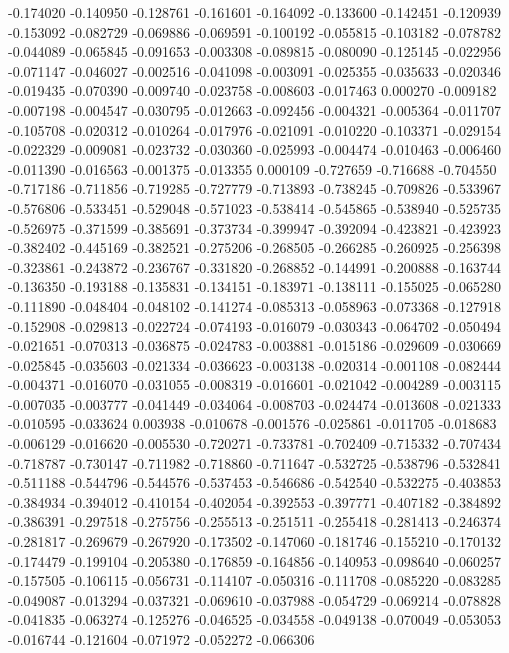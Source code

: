 -0.174020
-0.140950
-0.128761
-0.161601
-0.164092
-0.133600
-0.142451
-0.120939
-0.153092
-0.082729
-0.069886
-0.069591
-0.100192
-0.055815
-0.103182
-0.078782
-0.044089
-0.065845
-0.091653
-0.003308
-0.089815
-0.080090
-0.125145
-0.022956
-0.071147
-0.046027
-0.002516
-0.041098
-0.003091
-0.025355
-0.035633
-0.020346
-0.019435
-0.070390
-0.009740
-0.023758
-0.008603
-0.017463
0.000270
-0.009182
-0.007198
-0.004547
-0.030795
-0.012663
-0.092456
-0.004321
-0.005364
-0.011707
-0.105708
-0.020312
-0.010264
-0.017976
-0.021091
-0.010220
-0.103371
-0.029154
-0.022329
-0.009081
-0.023732
-0.030360
-0.025993
-0.004474
-0.010463
-0.006460
-0.011390
-0.016563
-0.001375
-0.013355
0.000109
-0.727659
-0.716688
-0.704550
-0.717186
-0.711856
-0.719285
-0.727779
-0.713893
-0.738245
-0.709826
-0.533967
-0.576806
-0.533451
-0.529048
-0.571023
-0.538414
-0.545865
-0.538940
-0.525735
-0.526975
-0.371599
-0.385691
-0.373734
-0.399947
-0.392094
-0.423821
-0.423923
-0.382402
-0.445169
-0.382521
-0.275206
-0.268505
-0.266285
-0.260925
-0.256398
-0.323861
-0.243872
-0.236767
-0.331820
-0.268852
-0.144991
-0.200888
-0.163744
-0.136350
-0.193188
-0.135831
-0.134151
-0.183971
-0.138111
-0.155025
-0.065280
-0.111890
-0.048404
-0.048102
-0.141274
-0.085313
-0.058963
-0.073368
-0.127918
-0.152908
-0.029813
-0.022724
-0.074193
-0.016079
-0.030343
-0.064702
-0.050494
-0.021651
-0.070313
-0.036875
-0.024783
-0.003881
-0.015186
-0.029609
-0.030669
-0.025845
-0.035603
-0.021334
-0.036623
-0.003138
-0.020314
-0.001108
-0.082444
-0.004371
-0.016070
-0.031055
-0.008319
-0.016601
-0.021042
-0.004289
-0.003115
-0.007035
-0.003777
-0.041449
-0.034064
-0.008703
-0.024474
-0.013608
-0.021333
-0.010595
-0.033624
0.003938
-0.010678
-0.001576
-0.025861
-0.011705
-0.018683
-0.006129
-0.016620
-0.005530
-0.720271
-0.733781
-0.702409
-0.715332
-0.707434
-0.718787
-0.730147
-0.711982
-0.718860
-0.711647
-0.532725
-0.538796
-0.532841
-0.511188
-0.544796
-0.544576
-0.537453
-0.546686
-0.542540
-0.532275
-0.403853
-0.384934
-0.394012
-0.410154
-0.402054
-0.392553
-0.397771
-0.407182
-0.384892
-0.386391
-0.297518
-0.275756
-0.255513
-0.251511
-0.255418
-0.281413
-0.246374
-0.281817
-0.269679
-0.267920
-0.173502
-0.147060
-0.181746
-0.155210
-0.170132
-0.174479
-0.199104
-0.205380
-0.176859
-0.164856
-0.140953
-0.098640
-0.060257
-0.157505
-0.106115
-0.056731
-0.114107
-0.050316
-0.111708
-0.085220
-0.083285
-0.049087
-0.013294
-0.037321
-0.069610
-0.037988
-0.054729
-0.069214
-0.078828
-0.041835
-0.063274
-0.125276
-0.046525
-0.034558
-0.049138
-0.070049
-0.053053
-0.016744
-0.121604
-0.071972
-0.052272
-0.066306
